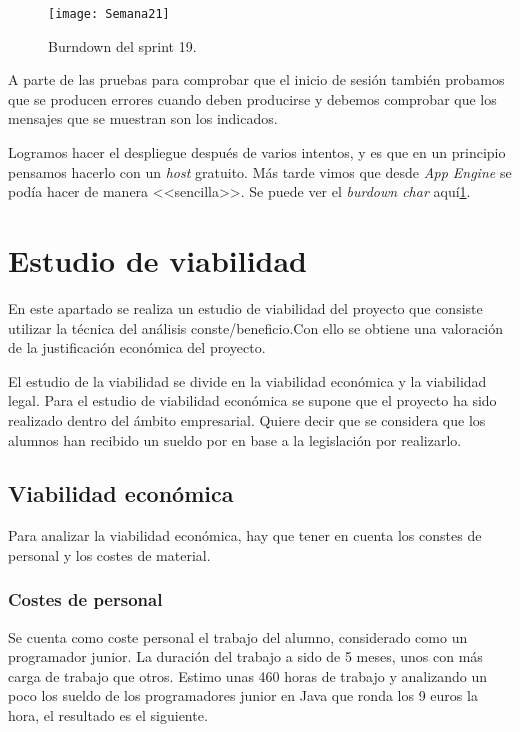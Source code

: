 \begin{figure}[h]
\centering
\texttt{[image: Semana21]}
\caption{Burndown del sprint 19.}
\label{fig:A.18}
\end{figure}

A parte de las pruebas para comprobar que el inicio de sesión también probamos que se producen errores cuando deben producirse y debemos comprobar que los mensajes que se muestran son los indicados.

Logramos hacer el despliegue después de varios intentos, y es que en un principio pensamos hacerlo con un \emph{host} gratuito. Más tarde vimos que desde \emph{App Engine} se podía hacer de manera <<sencilla>>. Se puede ver el \emph{burdown char} aquí\ref{fig:A.18}.

\section{Estudio de viabilidad}

En este apartado se realiza un estudio de viabilidad del proyecto que consiste utilizar la
técnica del análisis conste/beneficio.Con ello se obtiene una valoración de la justificación económica del proyecto.

El estudio de la viabilidad se divide en la
viabilidad económica y la viabilidad legal.
Para el estudio de viabilidad económica se supone que el proyecto ha sido realizado
dentro del ámbito empresarial. Quiere decir que se considera que los alumnos han recibido un sueldo por en base a la legislación por realizarlo.


\subsection{Viabilidad económica}

Para analizar la viabilidad económica, hay que tener en cuenta los constes de personal y los costes de material.

\subsubsection{Costes de personal}

Se cuenta como coste personal el trabajo del alumno, considerado como un programador junior. La duración del trabajo a sido de 5 meses, unos con más carga de trabajo que otros. Estimo unas 460 horas de trabajo y analizando un poco los sueldo de los programadores junior en Java que ronda los 9 euros la hora, el resultado es el siguiente.

